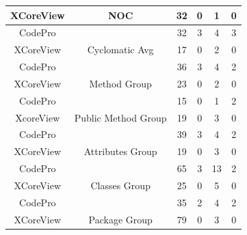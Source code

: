 \begin{table}
{\begin{tabular}{@{}|c|c|c|c|c|c|@{}}
XCoreView & \multirow{-2}{*}{\cellcolor[HTML]{FFFFFF}NOC} & 32 & 0 & 1 & 0 \\ \midrule
\rowcolor[HTML]{FFFFFF} 
CodePro & \cellcolor[HTML]{FFFFFF} & 32 & 3 & 4 & 3 \\ \cmidrule(r){1-1} \cmidrule(l){3-6} 
\rowcolor[HTML]{FFFFFF} 
XCoreView & \multirow{-2}{*}{\cellcolor[HTML]{FFFFFF}Cyclomatic Avg} & 17 & 0 & 2 & 0 \\ \midrule
\rowcolor[HTML]{FFFFFF} 
CodePro & \cellcolor[HTML]{FFFFFF} & 36 & 3 & 4 & 2 \\ \cmidrule(r){1-1} \cmidrule(l){3-6} 
\rowcolor[HTML]{FFFFFF} 
XCoreView & \multirow{-2}{*}{\cellcolor[HTML]{FFFFFF}Method Group} & 23 & 0 & 2 & 0 \\ \midrule
\rowcolor[HTML]{FFFFFF} 
CodePro & \cellcolor[HTML]{FFFFFF} & 15 & 0 & 1 & 2 \\ \cmidrule(r){1-1} \cmidrule(l){3-6} 
\rowcolor[HTML]{FFFFFF} 
XcoreView & \multirow{-2}{*}{\cellcolor[HTML]{FFFFFF}Public Method Group} & 19 & 0 & 3 & 0 \\ \midrule
\rowcolor[HTML]{FFFFFF} 
CodePro & \cellcolor[HTML]{FFFFFF} & 39 & 3 & 4 & 2 \\ \cmidrule(r){1-1} \cmidrule(l){3-6} 
\rowcolor[HTML]{FFFFFF} 
XCoreView & \multirow{-2}{*}{\cellcolor[HTML]{FFFFFF}Attributes Group} & 19 & 0 & 3 & 0 \\ \midrule
\rowcolor[HTML]{FFFFFF} 
CodePro & \cellcolor[HTML]{FFFFFF} & 65 & 3 & 13 & 2 \\ \cmidrule(r){1-1} \cmidrule(l){3-6} 
\rowcolor[HTML]{FFFFFF} 
XCoreView & \multirow{-2}{*}{\cellcolor[HTML]{FFFFFF}Classes Group} & 25 & 0 & 5 & 0 \\ \midrule
\rowcolor[HTML]{FFFFFF} 
CodePro & \cellcolor[HTML]{FFFFFF} & 35 & 2 & 4 & 2 \\ \cmidrule(r){1-1} \cmidrule(l){3-6} 
\rowcolor[HTML]{FFFFFF} 
XCoreView & \multirow{-2}{*}{\cellcolor[HTML]{FFFFFF}Package Group} & 79 & 0 & 3 & 0 \\ \bottomrule
\end{tabular}
}
\end{table}	